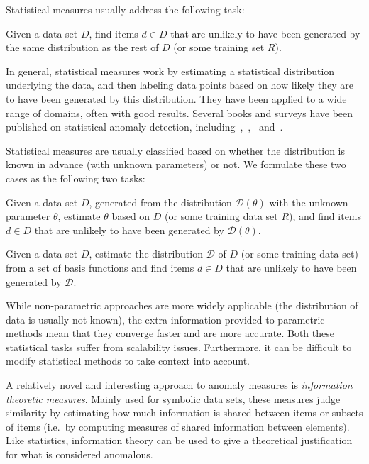 Statistical measures usually address the following task:
\begin{task}
\label{task:statistical}
  Given a data set $D$, find items $d \in D$ that are unlikely to have been generated by the same distribution as the rest of $D$ (or some training set $R$).
\end{task}
In general, statistical measures work by estimating a statistical distribution underlying the data, and then labeling data points based on how likely they are to have been generated by this distribution. They have been applied to a wide range of domains, often with good results. Several books and surveys have been published on statistical anomaly detection, including~\cite{barnett},~\cite{bakar},~\cite{leroy} and~\cite{hawkins}.

Statistical measures are usually classified based on whether the distribution is known in advance (with unknown parameters) or not. We formulate these two cases as the following two tasks:
\begin{task}
  Given a data set $D$, generated from the distribution $\mathcal{D}(\theta)$ with the unknown parameter $\theta$, estimate $\theta$ based on $D$ (or some training data set $R$), and find items $d \in D$ that are unlikely to have been generated by $\mathcal{D}(\theta)$.
\end{task}
\begin{task}
  Given a data set $D$, estimate the distribution $\mathcal{D}$ of $D$ (or some training data set) from a set of basis functions and find items $d \in D$ that are unlikely to have been generated by $\mathcal{D}$.
\end{task}
While non-parametric approaches are more widely applicable (the distribution of data is usually not known), the extra information provided to parametric methods mean that they converge faster and are more accurate. Both these statistical tasks suffer from scalability issues. Furthermore, it can be difficult to modify statistical methods to take context into account.

A relatively novel and interesting approach to anomaly measures is \emph{information theoretic measures}. Mainly used for symbolic data sets, these measures judge similarity by estimating how much information is shared between items or subsets of items (i.e.\ by computing measures of shared information between elements). Like statistics, information theory can be used to give a theoretical justification for what is considered anomalous.

